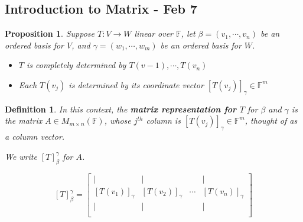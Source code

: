 \documentclass[12pt]{article}
\newtheorem{definition}{Definition}[subsection]
\newtheorem{proposition}{Proposition}[subsection]
\newcommand{\mF}{{\mathbb{F}}}
\begin{document}
	
	
	\newpage
	\subsection{Introduction to Matrix - Feb 7}
	\begin{proposition}
		Suppose $T:V\to W$ linear over $\mF$, 
		let $\beta = (v_1,\cdots, v_n)$ be an ordered basis for $V$,
		and $\gamma = (w_1, \cdots, w_m)$ be an ordered basis for $W$. 
		\begin{itemize}
			\item $T$ is completely determined by $T(v-1), \cdots, T(v_n)$
			\item Each $T(v_j)$ is determined by its coordinate vector 
				$[T(v_j)]_{\gamma} \in \mF^m$\\
		\end{itemize}
	\end{proposition}

	\begin{definition}
		In this context, the \textbf{matrix representation for $T$}
		for $\beta$ and $\gamma$ is the matrix $A \in M_{m\times n}(\mF)$, 
		whose $j^{th}$ column is $[T(v_j)]_{\gamma} \in \mF^m$, 
		thought of as a column vector.
		
		We write $[T]^{\gamma}_{\beta}$ for $A$. 

		\[
			[T]^{\gamma}_{\beta} = 
			\begin{bmatrix}
				| & | &  & | \\
				[T(v_1)]_{\gamma} & [T(v_2)]_{\gamma} & \cdots 
								  & [T(v_n)]_{\gamma}\\
				| & | & & | \\
			\end{bmatrix}
		\]\\
	\end{definition}
	
\end{document}
